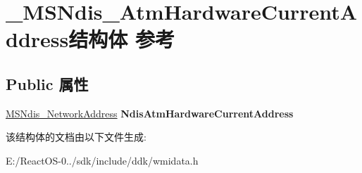 \hypertarget{struct___m_s_ndis___atm_hardware_current_address}{}\section{\+\_\+\+M\+S\+Ndis\+\_\+\+Atm\+Hardware\+Current\+Address结构体 参考}
\label{struct___m_s_ndis___atm_hardware_current_address}
\subsection*{Public 属性}
\begin{DoxyCompactItemize}
\item 
\mbox{\label{struct___m_s_ndis___atm_hardware_current_address_a052e92b1525f012c471203f4989ab561}} 
\hyperlink{struct___m_s_ndis___network_address}{M\+S\+Ndis\+\_\+\+Network\+Address} {\bfseries Ndis\+Atm\+Hardware\+Current\+Address}
\end{DoxyCompactItemize}


该结构体的文档由以下文件生成\+:\begin{DoxyCompactItemize}
\item 
E\+:/\+React\+O\+S-\/0../sdk/include/ddk/wmidata.\+h\end{DoxyCompactItemize}
